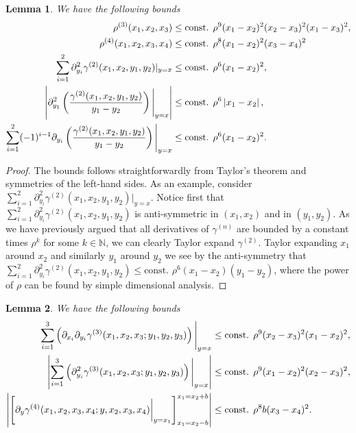 \documentclass[a4paper,11pt]{article}
\newcommand{\abs}[1]{\left\lvert #1 \right\rvert}
\newtheorem{lemma}{Lemma}
\numberwithin{equation}{section}
\begin{document}
	\begin{lemma}\label{LemmaDensityBounds}
		We have the following bounds\begin{equation}
		\begin{aligned}
		\rho^{(3)}(x_1,x_2,x_3)&\leq \textnormal{const. }\rho^9(x_1-x_2)^2(x_2-x_3)^2(x_1-x_3)^2,\\
		\rho^{(4)}(x_1,x_2,x_3,x_4)&\leq \textnormal{const. }\rho^8(x_1-x_2)^2(x_3-x_4)^2\\
		\sum_{i=1}^{2}\partial_{y_i}^2\gamma^{(2)}(x_1,x_2,y_1,y_2)\rvert_{y=x}&\leq \textnormal{const. } \rho^{6}(x_1-x_2)^2,\\
		\abs{\partial_{y_1}^2\left(\frac{\gamma^{(2)}(x_1,x_2,y_1,y_2)}{y_1-y_2}\right)\Bigg\rvert_{y=x}}&\leq \textnormal{const. } \rho^{6}\abs{x_1-x_2},\\
		\sum_{i=1}^{2}(-1)^{i-1}\partial_{y_i}\left(\frac{\gamma^{(2)}(x_1,x_2,y_1,y_2)}{y_1-y_2}\right)\Bigg\rvert_{y=x}&\leq \textnormal{const. } \rho^{6}(x_1-x_2)^2.
		\end{aligned}
		\end{equation}
	\end{lemma}
	\begin{proof}
		The bounds follows straightforwardly from Taylor's theorem and symmetries of the left-hand sides. As an example, consider $ \sum_{i=1}^{2}\partial_{y_i}^2\gamma^{(2)}(x_1,x_2,y_1,y_2)\rvert_{y=x} $. Notice first that $ \sum_{i=1}^{2}\partial_{y_i}^2\gamma^{(2)}(x_1,x_2,y_1,y_2) $ is anti-symmetric in $ (x_1,x_2) $ and in $ (y_1,y_2) $. As we have previously argued that all derivatives of $ \gamma^{(n)} $ are bounded by a constant times $ \rho^k $ for some $ k\in\mathbb{N} $, we can clearly Taylor expand $ \gamma^{(2)} $. Taylor expanding $ x_1 $ around $ x_2 $ and similarly $ y_1 $ around $ y_2 $ we see by the anti-symmetry that $ \sum_{i=1}^{2}\partial_{y_i}^2\gamma^{(2)}(x_1,x_2,y_1,y_2)\leq \text{const. }\rho^6(x_1-x_2)(y_1-y_2) $, where the power of $ \rho $ can be found by simple dimensional analysis.
	\end{proof}
	\begin{lemma} \label{LemmaDensityBounds2}
		We have the following bounds
		\begin{equation}
		\begin{aligned}
		\sum_{i=1}^{3}\left(\partial_{x_i}\partial_{y_i}\gamma^{(3)}(x_1,x_2,x_3;y_1,y_2,y_3)\right)\Bigg\vert_{y=x}&\leq \textnormal{const. }\rho^9(x_2-x_3)^2(x_1-x_2)^2,\\
		\abs{\sum_{i=1}^{3}\left(\partial_{y_i}^2\gamma^{(3)}(x_1,x_2,x_3;y_1,y_2,y_3)\right)\Bigg\vert_{y=x}}&\leq\textnormal{const. }\rho^9(x_1-x_2)^2(x_2-x_3)^2,\\
		\abs{\left[\partial_{y}\gamma^{(4)}(x_1,x_2,x_3,x_4;y,x_2,x_3,x_4)\bigg\vert_{y=x_1}\right]_{x_1=x_2-b}^{x_1=x_2+b}}&\leq \textnormal{const. }\rho^8b(x_3-x_4)^2.
		\end{aligned}
		\end{equation}
	\end{lemma}
\end{document}
